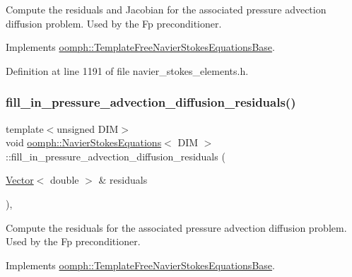 Compute the residuals and Jacobian for the associated pressure advection diffusion problem. Used by the Fp preconditioner. 



Implements \hyperlink{classoomph_1_1TemplateFreeNavierStokesEquationsBase_a5ce6cf1b23a079c7b8658b13f5b62c08}{oomph\+::\+Template\+Free\+Navier\+Stokes\+Equations\+Base}.



Definition at line 1191 of file navier\+\_\+stokes\+\_\+elements.\+h.

\mbox{\label{classoomph_1_1NavierStokesEquations_abea38bb5d8d50fc4b64ccdd5bcaf3c7c}} 
\subsubsection{\texorpdfstring{fill\+\_\+in\+\_\+pressure\+\_\+advection\+\_\+diffusion\+\_\+residuals()}{fill\_in\_pressure\_advection\_diffusion\_residuals()}}
{\footnotesize\ttfamily template$<$unsigned D\+IM$>$ \\
void \hyperlink{classoomph_1_1NavierStokesEquations}{oomph\+::\+Navier\+Stokes\+Equations}$<$ D\+IM $>$\+::fill\+\_\+in\+\_\+pressure\+\_\+advection\+\_\+diffusion\+\_\+residuals (\begin{DoxyParamCaption}\item[{\hyperlink{classoomph_1_1Vector}{Vector}$<$ double $>$ \&}]{residuals }\end{DoxyParamCaption})\hspace{0.3cm}{\ttfamily [inline]}, {\ttfamily [virtual]}}



Compute the residuals for the associated pressure advection diffusion problem. Used by the Fp preconditioner. 



Implements \hyperlink{classoomph_1_1TemplateFreeNavierStokesEquationsBase_ac3999c54eb656e922d7ec2f7506f18be}{oomph\+::\+Template\+Free\+Navier\+Stokes\+Equations\+Base}.



